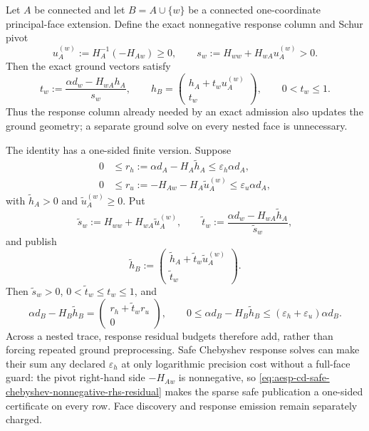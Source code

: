 \begin{proposition}
\label{prop:aesp-cd-proper-face-ground-admission-replay}
Let \(A\) be connected and let \(B=A\cup\{w\}\) be a connected
one-coordinate principal-face extension.  Define
the exact nonnegative response column and Schur pivot
\begin{equation*}
 u_A^{(w)}:=H_A^{-1}(-H_{Aw})\geq0,
 \qquad
 s_w:=H_{ww}+H_{wA}u_A^{(w)}>0.
\end{equation*}
Then the exact ground vectors satisfy
\begin{equation}
 t_w:=\frac{\alpha d_w-H_{wA}h_A}{s_w},
 \qquad
 h_B=
 \begin{pmatrix}
 h_A+t_wu_A^{(w)}\\ t_w
 \end{pmatrix},
 \qquad 0<t_w\leq1.
 \label{eq:aesp-cd-proper-face-ground-admission-exact}
\end{equation}
Thus the response column already needed by an exact admission also updates
the ground geometry; a separate ground solve on every nested face is
unnecessary.

The identity has a one-sided finite version.  Suppose
\begin{align*}
 0&\leq r_h:=\alpha d_A-H_A\widetilde h_A
       \leq\varepsilon_h\alpha d_A,\\
 0&\leq r_u:=-H_{Aw}-H_A\widetilde u_A^{(w)}
       \leq\varepsilon_u\alpha d_A,
\end{align*}
with \(\widetilde h_A>0\) and \(\widetilde u_A^{(w)}\geq0\).  Put
\begin{equation*}
 \widetilde s_w:=H_{ww}+H_{wA}\widetilde u_A^{(w)},
 \qquad
 \widetilde t_w:=
 \frac{\alpha d_w-H_{wA}\widetilde h_A}{\widetilde s_w},
\end{equation*}
and publish
\begin{equation}
 \widetilde h_B:=
 \begin{pmatrix}
 \widetilde h_A+\widetilde t_w\widetilde u_A^{(w)}\\
 \widetilde t_w
 \end{pmatrix}.
 \label{eq:aesp-cd-proper-face-ground-admission-finite}
\end{equation}
Then \(\widetilde s_w>0\), \(0<\widetilde t_w\leq t_w\leq1\), and
\begin{equation}
 \alpha d_B-H_B\widetilde h_B
 =
 \begin{pmatrix}
 r_h+\widetilde t_wr_u\\0
 \end{pmatrix},
 \qquad
 0\leq\alpha d_B-H_B\widetilde h_B
 \leq(\varepsilon_h+\varepsilon_u)\alpha d_B.
 \label{eq:aesp-cd-proper-face-ground-admission-residual}
\end{equation}
Across a nested trace, response residual budgets therefore add, rather than
forcing repeated ground preprocessing.  Safe Chebyshev response solves can
make their sum any declared \(\varepsilon_h\) at only logarithmic precision
cost without a full-face guard: the pivot right-hand side
\(-H_{Aw}\) is nonnegative, so
\cref{eq:aesp-cd-safe-chebyshev-nonnegative-rhs-residual} makes the sparse
safe publication a one-sided certificate on every row.  Face discovery and
response emission remain separately charged.


\end{proposition}
